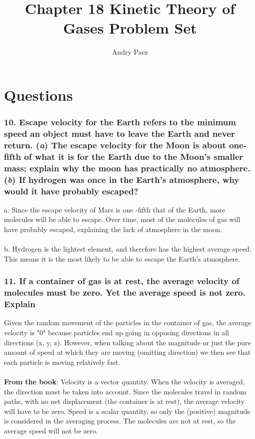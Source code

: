 \documentclass{article}
\title{Chapter 18 Kinetic Theory of Gases Problem Set}
\author{Andry Paez}
\date{}
\begin{document}
\maketitle

\section*{Questions}

\subsubsection*{10. Escape velocity for the Earth refers to the minimum speed an object must have to leave the Earth and never return. (\textit{a}) The escape velocity for the Moon is about one-fifth of what it is for the Earth due to the Moon's smaller mass; explain why the moon has practically no atmosphere. (\textit{b}) If hydrogen was once in the Earth's atmosphere, why would it have probably escaped?}
a. Since the escape velocity of Mars is one -fifth that of the Earth, more molecules will be able to escape. Over time, most of the molecules of gas will have probably escaped, explaining the lack of atmosphere in the moon. 
\\
\\
b. Hydrogen is the lightest element, and therefore has the highest average speed. This means it is the most likely to be able to escape the Earth's atmosphere.
\subsubsection*{11. If a container of gas is at rest, the average velocity of molecules must be zero. Yet the average speed is not zero. Explain}
Given the random movement of the particles in the container of gas, the average velocity is "0" because particles end up going in opposing directions in all directions (x, y, z). However, when talking about the magnitude or just the pure amount of speed at which they are moving (omitting direction) we then see that each particle is moving relatively fast.
\\ \\
\textbf{From the book}: Velocity is a vector quantity. When the velocity is averaged, the direction must be taken into account. Since the molecules travel in random paths, with no net displacement (the container is at rest), the average velocity will have to be zero. Speed is a scalar quantity, so only the (positive) magnitude is considered in the averaging process. The molecules are not at rest, so the average speed will not be zero.
\end{document}
